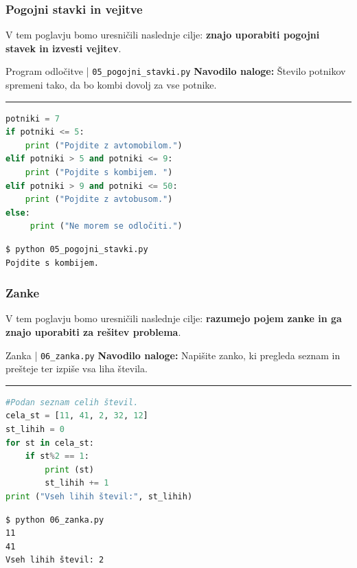 \subsubsection{Pogojni stavki in vejitve}
\label{sec:pogojni_stavki_vejitve}

V tem poglavju bomo uresničili naslednje cilje: \textbf{znajo
  uporabiti pogojni stavek in izvesti vejitev}.

\begin{examplebox}[label={prog:pogojni}]{Program odločitve |
    \texttt{05\_pogojni\_stavki.py} \cite{web:PTHardWay}}
\textbf{Navodilo naloge:}
Število potnikov spremeni tako, da bo kombi dovolj za vse potnike. 
\rule{\textwidth}{.4pt}
\begin{lstlisting}[language=Python]
potniki = 7
if potniki <= 5:
    print ("Pojdite z avtomobilom.")
elif potniki > 5 and potniki <= 9:
    print ("Pojdite s kombijem. ")
elif potniki > 9 and potniki <= 50:
    print ("Pojdite z avtobusom.")
else:
     print ("Ne morem se odločiti.")
\end{lstlisting}
\tcblower
\begin{Verbatim}[fontsize=\footnotesize]
$ python 05_pogojni_stavki.py
Pojdite s kombijem.
\end{Verbatim}
\end{examplebox}

\subsubsection{Zanke}
\label{sec:zanke}

V tem poglavju bomo uresničili naslednje cilje: \textbf{razumejo pojem zanke
in ga znajo uporabiti za rešitev problema}.

\begin{examplebox}[label={prog:zanka}]{Zanka |
    \texttt{06\_zanka.py} \cite{web:PTHardWay}}
  \textbf{Navodilo naloge:}
  Napišite zanko, ki pregleda seznam in prešteje ter izpiše vsa liha
  števila.
\rule{\textwidth}{.4pt}
\begin{lstlisting}[language=Python]
#Podan seznam celih števil.
cela_st = [11, 41, 2, 32, 12]
st_lihih = 0
for st in cela_st:
    if st%2 == 1:
        print (st)
        st_lihih += 1
print ("Vseh lihih števil:", st_lihih)
\end{lstlisting}
\tcblower
\begin{Verbatim}[fontsize=\footnotesize]
$ python 06_zanka.py
11
41
Vseh lihih števil: 2
\end{Verbatim}
\end{examplebox}

